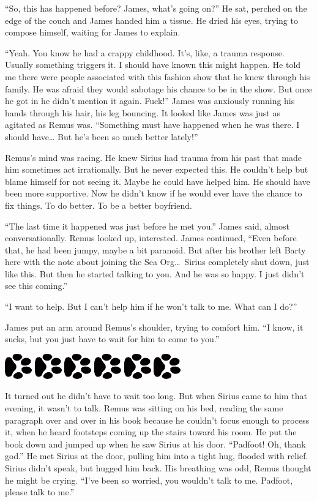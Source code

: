 \documentclass[12pt,twoside,openright]{memoir}
\newcommand{\myrulez}{	
	\begin{center}
		\hspace{.5em}
		\includegraphics[angle=60]{dogprint.pdf}
		\hspace{.5em}
		\includegraphics[angle=120]{dogprint.pdf}
		\hspace{.5em}
		\includegraphics[angle=60]{dogprint.pdf}
		\hspace{.5em}
		\includegraphics[angle=120]{dogprint.pdf}
		\hspace{.5em}
		\includegraphics[angle=60]{dogprint.pdf}
		\hspace{.5em}
		\includegraphics[angle=120]{dogprint.pdf}
		\hspace{.5em}
	\end{center}
}
\begin{document}
``So, this has happened before? James, what's going on?'' He sat, perched on the edge of the couch and James handed him a tissue. He dried his eyes, trying to compose himself, waiting for James to explain.

``Yeah. You know he had a crappy childhood. It's, like, a trauma response. Usually something triggers it. I should have known this might happen. He told me there were people associated with this fashion show that he knew through his family. He was afraid they would sabotage his chance to be in the show. But once he got in he didn't mention it again. Fuck!'' James was anxiously running his hands through his hair, his leg bouncing. It looked like James was just as agitated as Remus was. ``Something must have happened when he was there. I should have… But he's been so much better lately!''

Remus's mind was racing. He knew Sirius had trauma from his past that made him sometimes act irrationally. But he never expected this. He couldn't help but blame himself for not seeing it. Maybe he could have helped him. He should have been more supportive. Now he didn't know if he would ever have the chance to fix things. To do better. To be a better boyfriend.

``The last time it happened was just before he met you.'' James said, almost conversationally. Remus looked up, interested. James continued, ``Even before that, he had been jumpy, maybe a bit paranoid. But after his brother left Barty here with the note about joining the Sea Org\ldots\ Sirius completely shut down, just like this. But then he started talking to you. And he was so happy. I just didn't see this coming.'' 

``I want to help. But I can't help him if he won't talk to me. What can I do?'' 

James put an arm around Remus's shoulder, trying to comfort him. ``I know, it sucks, but you just have to wait for him to come to you.''

\myrulez

It turned out he didn't have to wait too long. But when Sirius came to him that evening, it wasn't to talk. Remus was sitting on his bed, reading the same paragraph over and over in his book because he couldn't focus enough to process it, when he heard footsteps coming up the stairs toward his room. He put the book down and jumped up when he saw Sirius at his door. ``Padfoot! Oh, thank god.'' He met Sirius at the door, pulling him into a tight hug, flooded with relief. Sirius didn't speak, but hugged him back. His breathing was odd, Remus thought he might be crying. ``I've been so worried, you wouldn't talk to me. Padfoot, please talk to me.''
\end{document}
